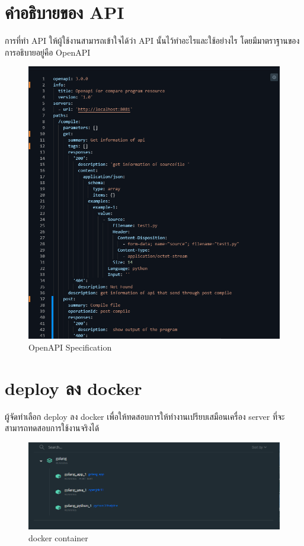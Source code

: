 \section{คำอธิบายของ API}
การที่ทำ API ให้ผู้ใช้งานสามารถเข้าใจได้ว่า API นั้นไว้ทำอะไรและใช้อย่างไร โดยมีมาตราฐานของการอธิบายอยู่คือ OpenAPI
        \begin{figure}[H]
            \centering
                \centering
                \includegraphics[width=5in]{latex/figures/OAS.png}
            \caption{OpenAPI Specification}
        \end{figure}
\section{deploy ลง docker}
ผู้จัดทำเลือก deploy ลง docker เพื่อให้ทดสอบการให้ทำงานเปรียบเสมือนเครื่อง server ที่จะสามารถทดสอบการใช้งานจริงได้ 
\begin{figure}[H]
    \centering
        \centering
        \includegraphics[width=5in]{latex/figures/docker.png}
    \caption{docker container}
\end{figure}

